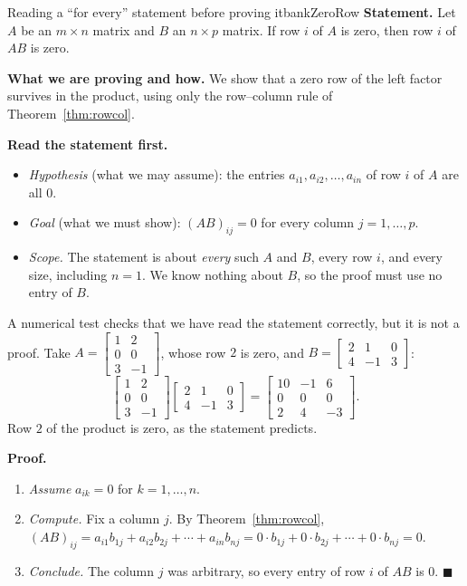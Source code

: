 \documentclass[11pt]{article}
\begin{document}
\begin{exmp}{Reading a ``for every'' statement before proving it}{bankZeroRow}
\textbf{Statement.} Let $A$ be an $m\times n$ matrix and $B$ an $n\times p$ matrix. If row $i$ of $A$ is zero, then row $i$ of $AB$ is zero.

\textbf{What we are proving and how.} We show that a zero row of the left factor survives in the product, using only the row--column rule of Theorem~\ref{thm:rowcol}.

\textbf{Read the statement first.}
\begin{itemize}
  \item \emph{Hypothesis} (what we may assume): the entries $a_{i1},a_{i2},\dots,a_{in}$ of row $i$ of $A$ are all $0$.
  \item \emph{Goal} (what we must show): $(AB)_{ij}=0$ for every column $j=1,\dots,p$.
  \item \emph{Scope.} The statement is about \emph{every} such $A$ and $B$, every row $i$, and every size, including $n=1$. We know nothing about $B$, so the proof must use no entry of $B$.
\end{itemize}
A numerical test checks that we have read the statement correctly, but it is not a proof. Take $A=\begin{bmatrix}1&2\\0&0\\3&-1\end{bmatrix}$, whose row $2$ is zero, and $B=\begin{bmatrix}2&1&0\\4&-1&3\end{bmatrix}$:
\[
\begin{bmatrix}1&2\\0&0\\3&-1\end{bmatrix}\begin{bmatrix}2&1&0\\4&-1&3\end{bmatrix}=\begin{bmatrix}10&-1&6\\0&0&0\\2&4&-3\end{bmatrix}.
\]
Row $2$ of the product is zero, as the statement predicts.

\textbf{Proof.}
\begin{enumerate}[itemsep=2pt]
  \item \emph{Assume} $a_{ik}=0$ for $k=1,\dots,n$.
  \item \emph{Compute.} Fix a column $j$. By Theorem~\ref{thm:rowcol}, $(AB)_{ij}=a_{i1}b_{1j}+a_{i2}b_{2j}+\cdots+a_{in}b_{nj}=0\cdot b_{1j}+0\cdot b_{2j}+\cdots+0\cdot b_{nj}=0$.
  \item \emph{Conclude.} The column $j$ was arbitrary, so every entry of row $i$ of $AB$ is $0$. \qquad$\blacksquare$
\end{enumerate}


\end{exmp}
\end{document}
